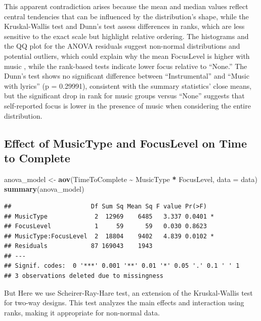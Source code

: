 \documentclass[
]{article}
\newenvironment{Shaded}{\begin{snugshade}}{\end{snugshade}}
\newcommand{\AttributeTok}[1]{\textcolor[rgb]{0.13,0.29,0.53}{#1}}
\newcommand{\FunctionTok}[1]{\textcolor[rgb]{0.13,0.29,0.53}{\textbf{#1}}}
\newcommand{\NormalTok}[1]{#1}
\newcommand{\OtherTok}[1]{\textcolor[rgb]{0.56,0.35,0.01}{#1}}
\newcommand{\SpecialCharTok}[1]{\textcolor[rgb]{0.81,0.36,0.00}{\textbf{#1}}}
\begin{document}
This apparent contradiction arises because the mean and median values
reflect central tendencies that can be influenced by the distribution's
shape, while the Kruskal-Wallis test and Dunn's test assess differences
in ranks, which are less sensitive to the exact scale but highlight
relative ordering. The histograms and the QQ plot for the ANOVA
residuals suggest non-normal distributions and potential outliers, which
could explain why the mean FocusLevel is higher with music , while the
rank-based tests indicate lower focus relative to ``None.'' The Dunn's
test shows no significant difference between ``Instrumental'' and
``Music with lyrics'' (p = 0.29991), consistent with the summary
statistics' close means, but the significant drop in rank for music
groups versus ``None'' suggests that self-reported focus is lower in the
presence of music when considering the entire distribution.

\subsection{Effect of MusicType and FocusLevel on Time to
Complete}\label{effect-of-musictype-and-focuslevel-on-time-to-complete}

\begin{Shaded}
\begin{Highlighting}[]
\NormalTok{anova\_model }\OtherTok{\textless{}{-}} \FunctionTok{aov}\NormalTok{(TimeToComplete }\SpecialCharTok{\textasciitilde{}}\NormalTok{ MusicType }\SpecialCharTok{*}\NormalTok{ FocusLevel, }\AttributeTok{data =}\NormalTok{ data)}
\FunctionTok{summary}\NormalTok{(anova\_model)}
\end{Highlighting}
\end{Shaded}

\begin{verbatim}
##                      Df Sum Sq Mean Sq F value Pr(>F)  
## MusicType             2  12969    6485   3.337 0.0401 *
## FocusLevel            1     59      59   0.030 0.8623  
## MusicType:FocusLevel  2  18804    9402   4.839 0.0102 *
## Residuals            87 169043    1943                 
## ---
## Signif. codes:  0 '***' 0.001 '**' 0.01 '*' 0.05 '.' 0.1 ' ' 1
## 3 observations deleted due to missingness
\end{verbatim}

But Here we use Scheirer-Ray-Hare test, an extension of the
Kruskal-Wallis test for two-way designs. This test analyzes the main
effects and interaction using ranks, making it appropriate for
non-normal data.
\end{document}
